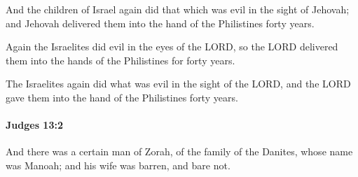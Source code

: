 			\begin{versebox}
					\item[BHS] 
					\item[ASV] And the children of Israel again did that which was evil in the sight of Jehovah; and Jehovah delivered them into the hand of the Philistines forty years.
					\item[NIV] Again the Israelites did evil in the eyes of the LORD, so the LORD delivered them into the hands of the Philistines for forty years.
					\item[NRSV] The Israelites again did what was evil in the sight of the LORD, and the LORD gave them into the hand of the Philistines forty years.
			\end{versebox}

		\paragraph{Judges 13:2} %
			\label{JUDGES-13-2}

			And there was a certain man of Zorah, of the family of the Danites, whose name was Manoah; and his wife was barren, and bare not.

